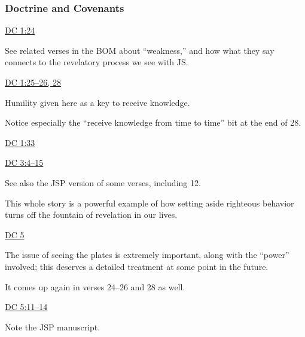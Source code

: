 	\subsubsection{Doctrine and Covenants} %
		\label{EPIST-REVELATION-DC}
	
		
		\begin{compactdesc}
			\item \hyperref[DC1-24]{DC 1:24}
				\begin{compactitem}
					\item See related verses in the BOM about ``weakness,'' and how what they say connects to the revelatory process we see with JS.
				\end{compactitem}
			\item \hyperref[DC1-25]{DC 1:25--26, 28}
				\begin{compactitem}
					\item Humility given here as a key to receive knowledge.
					\item Notice especially the ``receive knowledge from time to time'' bit at the end of 28.
				\end{compactitem}
			\item \hyperref[DC1-33]{DC 1:33}
			\item \hyperref[DC3-4]{DC 3:4--15}
				\begin{compactitem}
					\item See also the JSP version of some verses, including 12.
					\item This whole story is a powerful example of how setting aside righteous behavior turns off the fountain of revelation in our lives.
				\end{compactitem}
			\item \hyperref[DC5]{DC 5} 
				\begin{compactitem}
					\item The issue of seeing the plates is extremely important, along with the ``power'' involved; this deserves a detailed treatment at some point in the future.
					\item It comes up again in verses 24--26 and 28 as well.
				\end{compactitem}
			\item \hyperref[DC5-11]{DC 5:11--14}
				\begin{compactitem}
					\item Note the JSP manuscript.

\end{compactitem}
\end{compactdesc}
